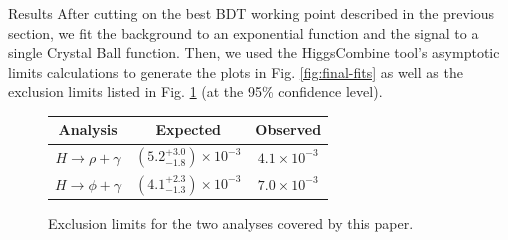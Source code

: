 \begin{section}{Results}
After cutting on the best BDT working point described in the previous section, we fit the background to an exponential function and the signal to a single Crystal Ball function. Then, we used the HiggsCombine tool's asymptotic limits calculations\cite{cite-hcomb} to generate the plots in Fig. \ref{fig:final-fits} as well as the exclusion limits listed in Fig. \ref{fig:exclude-lims} (at the 95\% confidence level).

\begin{figure}[htb]
\centering
\begin{tabular}{ccc}
\toprule
Analysis & Expected & Observed \\
\midrule
$H\rightarrow\rho+\gamma$ & $(5.2^{+3.0}_{-1.8})\times10^{-3}$ & $4.1\times10^{-3}$ \\
$H\rightarrow\phi+\gamma$ & $(4.1^{+2.3}_{-1.3})\times10^{-3}$ & $7.0\times10^{-3}$ \\
\bottomrule
\end{tabular}
\caption{Exclusion limits for the two analyses covered by this paper.}
\label{fig:exclude-lims}
\end{figure}


\end{section}

